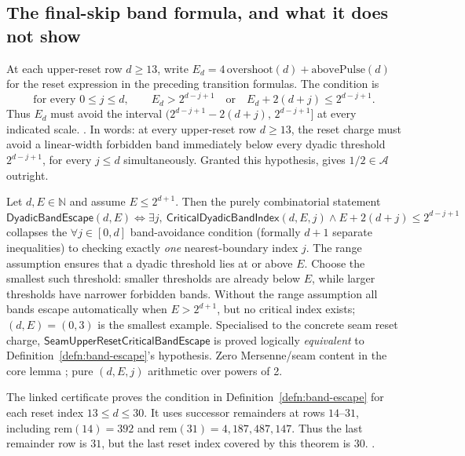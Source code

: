 \subsection{The final-skip band formula, and what it does not show}

\begin{defn}
\label{defn:band-escape}
At each upper-reset row $d\ge13$, write
$E_d=4\,\mathrm{overshoot}(d)+\mathrm{abovePulse}(d)$ for the reset
expression in the preceding transition formulas.  The condition is
\[
 \text{for every }0\le j\le d,\qquad
 E_d>2^{d-j+1}\quad\text{or}\quad
 E_d+2(d+j)\le2^{d-j+1}.
\]
Thus $E_d$ must avoid the interval
$(2^{d-j+1}-2(d+j),\,2^{d-j+1}]$ at every indicated scale.
.
In words: at every upper-reset row $d\ge13$, the reset charge must avoid a linear-width forbidden
band immediately below every dyadic threshold $2^{d-j+1}$, for every $j\le d$ simultaneously.
Granted this hypothesis,
gives $1/2\in\mathcal A$ outright.
\end{defn}

\begin{prop}
\label{prop:critical-band-index}
Let $d,E\in\mathbb N$ and assume $E\le2^{d+1}$. Then the purely combinatorial statement
$\mathsf{DyadicBandEscape}(d,E) \iff \exists j,\ \mathsf{CriticalDyadicBandIndex}(d,E,j)\land
E+2(d+j)\le 2^{d-j+1}$ collapses the $\forall j\in[0,d]$ band-avoidance condition (formally $d{+}1$
separate inequalities) to checking exactly \emph{one} nearest-boundary index $j$.
The range assumption ensures that a dyadic threshold lies at or above $E$.
Choose the smallest such threshold: smaller thresholds are already below
$E$, while larger thresholds have narrower forbidden bands. Without the
range assumption all bands escape automatically when $E>2^{d+1}$, but no
critical index exists; $(d,E)=(0,3)$ is the smallest example.
Specialised to the
concrete seam reset charge, $\mathsf{SeamUpperResetCriticalBandEscape}$ is proved logically
\emph{equivalent} to Definition~\ref{defn:band-escape}'s hypothesis.
Zero Mersenne/seam content in the core lemma ;  pure $(d,E,j)$ arithmetic over powers of 2.
\end{prop}

\begin{obs}
\label{cert:band-through-31}
The linked certificate proves the condition in
Definition~\ref{defn:band-escape} for each reset index $13\le d\le30$.
It uses successor remainders at rows $14$--$31$, including
$\mathrm{rem}(14)=392$ and $\mathrm{rem}(31)=4{,}187{,}487{,}147$.
Thus the last remainder row is $31$, but the last reset index covered
by this theorem is $30$.
.
\end{obs}

